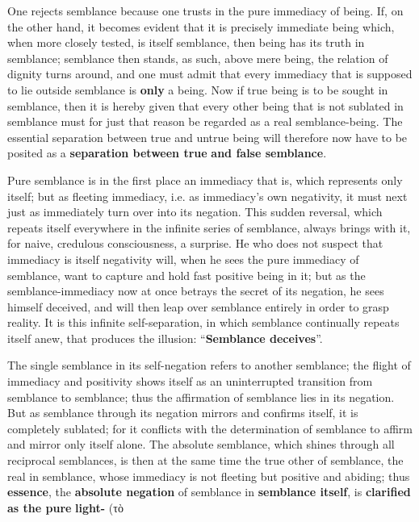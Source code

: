\documentclass[12pt,a4paper,openany]{book}
\newcommand{\opage}[1]{\marginnote{\footnotesize\textit{[#1]}}}
\begin{document}
One rejects semblance because one trusts in the pure immediacy of being. If, on the other hand, it becomes evident that it is precisely immediate being which, when more closely tested, is itself semblance, then being has its truth in semblance; semblance then stands, as such, above mere being, the relation of dignity turns around, and one must admit that every immediacy that is supposed to lie outside semblance is \textbf{only} a being. Now if true being is to be sought in semblance, then it is hereby given that every other being that is not sublated in semblance must for just that reason be regarded as a real semblance-being. The essential separation between true and untrue being will therefore now have to be posited as a \textbf{separation between true} \textbf{and false semblance}.

Pure semblance is in the first place an immediacy that is, which represents only itself; but as fleeting immediacy, i.e. as immediacy's own negativity, it must next just as immediately turn over into its negation. This sudden reversal, which repeats itself everywhere in the infinite series of semblance, always brings with it, for naive, credulous consciousness, a
\setcounter{footnote}{0}%
\opage{100}surprise. He who does not suspect that immediacy is itself negativity will, when he sees the pure immediacy of semblance, want to capture and hold fast positive being in it; but as the semblance-immediacy now at once betrays the secret of its negation, he sees himself deceived, and will then leap over semblance entirely in order to grasp reality. It is this infinite self-separation, in which semblance continually repeats itself anew, that produces the illusion: ``\textbf{Semblance deceives}''.

The single semblance in its self-negation refers to another semblance; the flight of immediacy and positivity shows itself as an uninterrupted transition from semblance to semblance; thus the affirmation of semblance lies in its negation. But as semblance through its negation mirrors and confirms itself, it is completely sublated; for it conflicts with the determination of semblance to affirm and mirror only itself alone. The absolute semblance, which shines through all reciprocal semblances, is then at the same time the true other of semblance, the real in semblance, whose immediacy is not fleeting but positive and abiding; thus \textbf{essence}, the \textbf{absolute negation} of semblance in \textbf{semblance itself}, is \textbf{clarified as the pure} \textbf{light-} (τὸ
\end{document}
